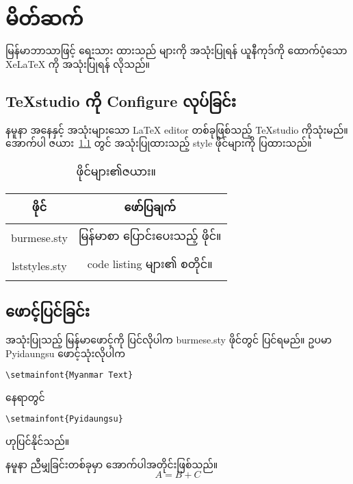 \chapter{မိတ်ဆက်}
\label{ch:Introduction}

မြန်မာဘာသာဖြင့် ရေးသား ထားသည် များကို အသုံးပြုရန် ယူနီကုဒ်ကို ထောက်ပံ့သော XeLaTeX ကို အသုံးပြုရန် လိုသည်။ 
\section{TeXstudio ကို Configure လုပ်ခြင်း}

နမူနာ အနေနှင့် အသုံးများသော LaTeX editor တစ်ခုဖြစ်သည့် TeXstudio ကိုသုံးမည်။
အောက်ပါ ဇယား~\ref{tbl_eg} တွင် အသုံးပြုထားသည့် style ဖိုင်များကို ပြထားသည်။

\begin{table}[h]\footnotesize
	\centering	
	\caption{ဖိုင်များ၏ဇယား။}
\begin{tabular}{| c | c | }	
	\hline
	ဖိုင်  & ဖော်ပြချက် \\
	\hline
	burmese.sty & မြန်မာစာ ပြောင်းပေးသည့် ဖိုင်။  \\
	\hline
	lststyles.sty & code listing များ၏ စတိုင်။  \\
	\hline
\end{tabular}
	\label{tbl_eg}
\end{table}

\section{ဖောင့်ပြင်ခြင်း}

အသုံးပြုသည့် မြန်မာဖောင့်ကို ပြင်လိုပါက burmese.sty ဖိုင်တွင် ပြင်ရမည်။
 ဥပမာ Pyidaungsu ဖောင့်သုံးလိုပါက
\begin{lstlisting}[style=myTeX,caption={မူရင်ဖောင့် သတ်မှတ်ချက်။},label={lstMTFont}]
\setmainfont{Myanmar Text}
\end{lstlisting}
 နေရာတွင်
\begin{lstlisting}[style=myTeX,caption={ဖောင့်အမည်ကိုပြင်ခြင်း။},label={lstPDFont}]
\setmainfont{Pyidaungsu}
\end{lstlisting}
 ဟုပြင်နိုင်သည်။ 
 
 နမူနာ ညီမျှခြင်းတစ်ခုမှာ အောက်ပါအတိုင်းဖြစ်သည်။
 \begin{equation}
 A = B + C
 \end{equation}
